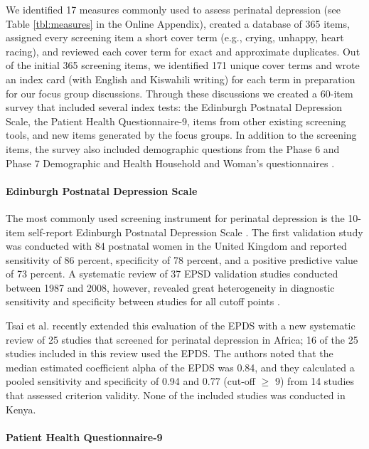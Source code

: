 \documentclass[man,natbib,longtable]{apa6}\usepackage[]{graphicx}\usepackage[]{color}
\begin{document}
We identified 17 measures commonly used to assess perinatal depression (see Table \ref{tbl:measures} in the Online Appendix), created a database of 365 items, assigned every screening item a short cover term (e.g., crying, unhappy, heart racing), and reviewed each cover term for exact and approximate duplicates. Out of the initial 365 screening items, we identified 171 unique cover terms and wrote an index card (with English and Kiswahili writing) for each term in preparation for our focus group discussions. Through these discussions we created a 60-item survey that included several index tests: the Edinburgh Postnatal Depression Scale, the Patient Health Questionnaire-9, items from other existing screening tools, and new items generated by the focus groups. In addition to the screening items, the survey also included demographic questions from the Phase 6 and Phase 7 Demographic and Health Household and Woman's questionnaires \citep{DHSQ}.

\paragraph{Edinburgh Postnatal Depression Scale}

The most commonly used screening instrument for perinatal depression is the 10-item self-report Edinburgh Postnatal Depression Scale \citep[EPDS;][]{Cox:1987}. The first validation study was conducted with 84 postnatal women in the United Kingdom and reported sensitivity of 86 percent, specificity of 78 percent, and a positive predictive value of 73 percent. A systematic review of 37 EPSD validation studies conducted between 1987 and 2008, however, revealed great heterogeneity in diagnostic sensitivity and specificity between studies for all cutoff points \citep{Gibson:2009}. 

Tsai et al. \citeyear{Tsai:2013} recently extended this evaluation of the EPDS with a new systematic review of 25 studies that screened for perinatal depression in Africa; 16 of the 25 studies included in this review used the EPDS. The authors noted that the median estimated coefficient alpha of the EPDS was 0.84, and they calculated a pooled sensitivity and specificity of 0.94 and 0.77 (cut-off  $\geq$ 9) from 14 studies that assessed criterion validity. None of the included studies was conducted in Kenya.

\paragraph{Patient Health Questionnaire-9}
\end{document}

